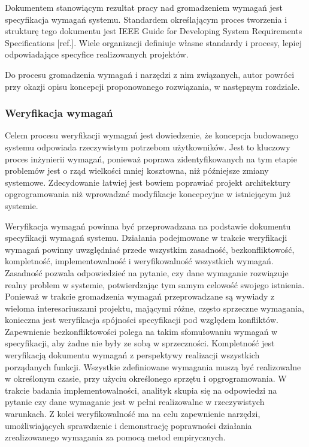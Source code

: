         Dokumentem stanowiącym rezultat pracy nad gromadzeniem wymagań jest specyfikacja wymagań systemu. Standardem określającym proces tworzenia i strukturę tego dokumentu jest IEEE Guide for Developing System Requirements Specifications [ref.]. Wiele organizacji definiuje własne standardy i procesy, lepiej odpowiadające specyfice realizowanych projektów.

        Do procesu gromadzenia wymagań i narzędzi z nim związanych, autor powróci przy okazji opisu koncepcji proponowanego rozwiązania, w następnym rozdziale.

      \subsubsection{Weryfikacja wymagań}

        Celem procesu weryfikacji wymagań jest dowiedzenie, że koncepcja budowanego systemu odpowiada rzeczywistym potrzebom użytkowników. Jest to kluczowy proces inżynierii wymagań, ponieważ poprawa zidentyfikowanych na tym etapie problemów jest o rząd wielkości mniej kosztowna, niż późniejsze zmiany systemowe. Zdecydowanie łatwiej jest bowiem poprawiać projekt architektury opgrogramowania niż wprowadzać modyfikacje koncepcyjne w istniejącym już systemie. 

        Weryfikacja wymagań powinna być przeprowadzana na podstawie dokumentu specyfikacji wymagań systemu. Działania podejmowane w trakcie weryfikacji wymagań powinny uwzględniać przede wszystkim zasadność, bezkonfliktowość, kompletność, implementowalność i weryfikowalność wszystkich wymagań. Zasadność pozwala odpowiedzieć na pytanie, czy dane wymaganie rozwiązuje realny problem w systemie, potwierdzając tym samym celowość swojego istnienia. Ponieważ w trakcie gromadzenia wymagań przeprowadzane są wywiady z wieloma interesariuszami projektu, mającymi różne, często sprzeczne wymagania, konieczna jest weryfikacja spójności specyfikacji pod względem konfliktów. Zapewnienie bezkonfliktowości polega na takim sfomułowaniu wymagań w specyfikacji, aby żadne nie były ze sobą w sprzeczności. Kompletność jest weryfikacją dokumentu wymagań z perspektywy realizacji wszystkich porządanych funkcji. Wszystkie zdefiniowane wymagania muszą być realizowalne w określonym czasie, przy użyciu określonego sprzętu i opgrogramowania. W trakcie badania implementowalności, analityk skupia się na odpowiedzi na pytanie czy dane wymaganie jest w pełni realizowalne w rzeczywistych warunkach. Z kolei weryfikowalność ma na celu zapewnienie narzędzi, umożliwiających sprawdzenie i demonstrację poprawności działania zrealizowanego wymagania za pomocą metod empirycznych.

